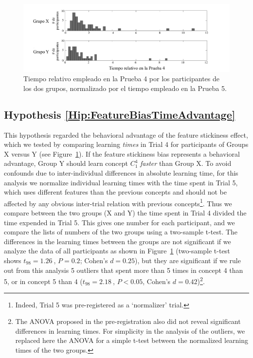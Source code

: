  
 \begin{figure}
\begin{center}
	\includegraphics[scale=.5]{papers/images_behavior_research_methods/results_2_sp.pdf}
\end{center}
\caption{
Tiempo relativo empleado en la Prueba 4 por los participantes de los dos grupos, normalizado por el tiempo empleado en la Prueba 5.
}
\label{fig:results2}
\end{figure}



\subsection{Hypothesis \ref{Hip:FeatureBiasTimeAdvantage}}\label{Results:FeatureBiasTimeAdvantage} 
This hypothesis regarded the behavioral advantage of the feature stickiness effect, which we tested by comparing learning \emph{times} in Trial 4 for participants of Groups X versus Y (see Figure~\ref{fig:results2}).
If the feature stickiness bias represents a behavioral advantage, Group Y should learn concept $C^4_1$ \emph{faster} than Group X. To avoid confounds due to inter-individual differences in absolute learning time, for this analysis we normalize individual learning times with the time spent in Trial 5, which uses different features than the previous concepts and should not be affected by any obvious inter-trial relation with previous concepts\footnote{Indeed, Trial 5 was pre-registered as a `normalizer' trial.}. Thus we compare between the two groups (X and Y) the time spent in Trial 4 divided the time expended in Trial 5. This gives one number for each participant, and we compare the lists of numbers of the two groups using a two-sample t-test.  The differences in the learning times between the groups are not significant if we analyze the data of all participants as shown in Figure~\ref{fig:results2} (two-sample t-test shows $t_{98}=1.26 \ $,  $P=0.2$; Cohen's $d=0.25$), but they are significant if we rule out from this analysis 5 outliers that spent more than 5 times in concept 4 than 5, or in concept 5 than 4 ($t_{98}=2.18 \ $,  $P<0.05$, Cohen's $d=0.42$)\footnote{The ANOVA proposed in the pre-registration also did not reveal significant differences in learning times. For simplicity in the analysis of the outliers, we replaced here the ANOVA for a simple t-test between the normalized learning times of the two groups.}.



